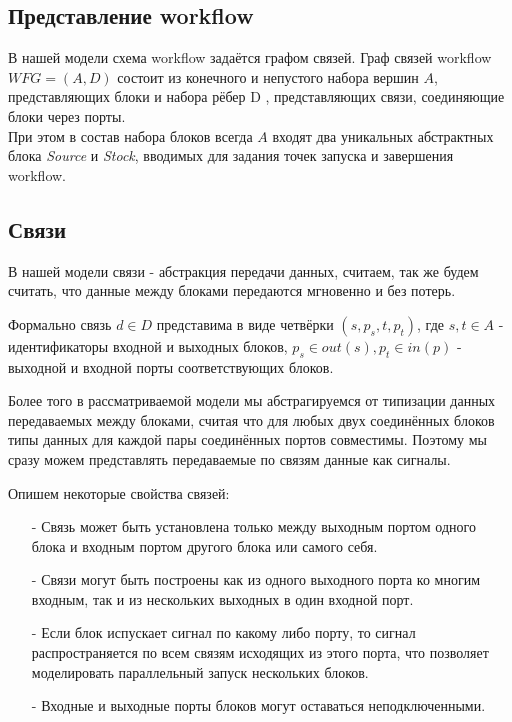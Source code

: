\documentclass[koi8-r,usehyperref,12pt]{G7-32}
\begin{document}




\subsection{Представление workflow}
В нашей модели схема workflow задаётся графом связей.
 Граф связей workflow $WFG =(A, D)$ состоит из конечного и непустого набора вершин $A$, представляющих блоки и набора рёбер D , представляющих связи, соединяющие блоки через порты.\\
 При этом в состав набора блоков всегда $A$ входят два уникальных абстрактных блока \textit{Source} и \textit{Stock}, вводимых для задания точек запуска и завершения workflow.

\subsection{Связи} 
В нашей модели связи - абстракция передачи данных, считаем, так же будем считать, что данные между блоками передаются мгновенно и без потерь.

 Формально связь $d \in D$ представима в виде четвёрки $(s, p_{s}, t, p_{t})$, где $s,t \in A$ - идентификаторы входной и выходных блоков,  $ p_{s} \in out(s), p_{t} \in in(p)$ - выходной и входной порты соответствующих блоков. 

Более того в рассматриваемой модели мы абстрагируемся от типизации данных передаваемых между блоками, считая что для любых двух соединённых блоков типы данных для каждой пары соединённых портов совместимы. Поэтому мы сразу можем представлять передаваемые по связям данные как сигналы.


Опишем некоторые свойства связей:
\begin{enumerate}
\item[-] Связь может быть установлена только между выходным портом одного блока и входным портом другого блока или самого себя.
\item[-] Связи могут быть построены как из одного выходного порта ко многим входным, так и из нескольких выходных в один входной порт.
\item[-] Если блок испускает сигнал по какому либо порту, то сигнал распространяется по всем связям исходящих из этого порта, что позволяет моделировать параллельный запуск нескольких блоков.
\item[-] Входные и выходные порты блоков могут оставаться неподключенными.
\end{enumerate}
 
\end{document}
